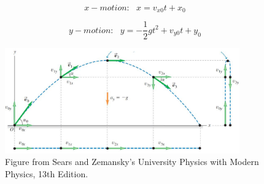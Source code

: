 \documentclass[]{beamer}
\begin{document}
\begin{frame}
   
  

  \begin{equation}
    x-motion:\ \ \  x=v_{x0}t+x_0
  \end{equation}
  

  \begin{equation}
    y-motion: \ \ \ y=-\frac{1}{2}gt^ 2+v_{y0}t+y_0
  \end{equation}

  \begin{figure}[h!]  
    \includegraphics[width=0.9\textwidth]{images/19.jpg}
     \caption{ {\tiny Figure from Sears and Zemansky's University Physics 
     with Modern Physics, 13th Edition.} }
  \end{figure}
   


\end{frame}


\end{document}
